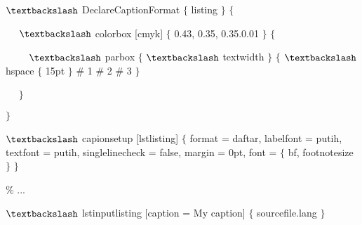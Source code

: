  $\textbackslash$ DeclareCaptionFormat $ \{ $ listing $ \} $ $ \{ $\par

~~ $\textbackslash$ colorbox [cmyk] $ \{ $ 0.43, 0.35, 0.35.0.01 $ \} $ $ \{ $\par

~~~~ $\textbackslash$ parbox $ \{ $ $\textbackslash$ textwidth $ \} $ $ \{ $ $\textbackslash$ hspace $ \{ $ 15pt $ \} $ $\#$ 1 $\#$ 2 $\#$ 3 $ \} $\par

~~ $ \} $\par

 $ \} $\par

 $\textbackslash$ capionsetup [lstlisting] $ \{ $ format = daftar, labelfont = putih, textfont = putih, singlelinecheck = false, margin = 0pt, font = $ \{ $ bf, footnotesize $ \} $ $ \} $\par

 $\%$ ...\par

 $\textbackslash$ lstinputlisting [caption = My caption] $ \{ $ sourcefile.lang $ \} $\par
